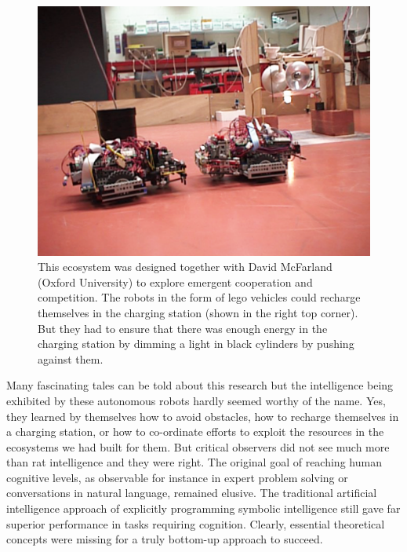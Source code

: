 \begin{figure}[htbp]
  \centerline{\includegraphics[width=.80\textwidth]{chap1/figs/ecosystem.pdf}}
\caption{This ecosystem was designed together with David McFarland (Oxford University) to explore 
emergent cooperation and competition. The robots in the form of lego vehicles could recharge themselves in the charging 
station (shown in the right top corner). But they had to ensure that there was enough energy in the charging 
station by dimming a light in black cylinders by pushing against them.}
\label{f:plate6}
\end{figure}

Many fascinating tales can be told about this research but the intelligence being exhibited 
by these autonomous robots hardly seemed worthy of the name. Yes, they learned
by themselves how to avoid obstacles, how to recharge themselves
in a charging station, or how to co-ordinate efforts 
to exploit the resources in the ecosystems we had built for 
them. But critical observers did not see much more than 
rat intelligence and they were right. The original 
goal of reaching human 
cognitive levels, as observable for instance in 
expert problem solving or conversations in natural
language, remained elusive. The 
traditional artificial intelligence
approach of explicitly programming symbolic intelligence
still gave far superior performance in tasks requiring
cognition. Clearly, essential theoretical concepts were 
missing for a truly bottom-up approach to succeed. 

